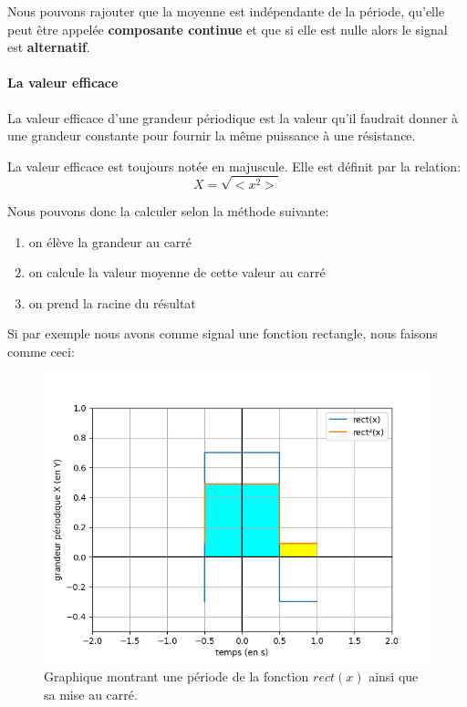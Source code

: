 \documentclass[12pt,a4paper,openany]{book}
\begin{document}
Nous pouvons rajouter que la moyenne est indépendante de la période, qu'elle peut être appelée \textbf{composante continue} et que si elle est nulle alors le signal est \textbf{alternatif}.

\paragraph{La valeur efficace} 
\begin{Definition}
La valeur efficace d'une grandeur périodique est la valeur qu'il faudrait donner à une grandeur constante pour fournir la même puissance à une résistance.
\end{Definition} 

La valeur efficace est toujours notée en majuscule. Elle est définit par la relation:
\begin{equation}
X = \sqrt{< x^{2} >}
\label{relationGrandeurEfficace}
\end{equation}

Nous pouvons donc la calculer selon la méthode suivante:
\begin{enumerate}
\item on élève la grandeur au carré
\item on calcule la valeur moyenne de cette valeur au carré
\item on prend la racine du résultat
\end{enumerate}

Si par exemple nous avons comme signal une fonction rectangle, nous faisons comme ceci:
\begin{figure}[!h]
\begin{center}
\includegraphics[scale=0.8]{Images/grapheAuCarre.png} 
\caption{Graphique montrant une période de la fonction $ rect(x) $ ainsi que sa mise au carré.}
\label{grapheFonctionMiseAuCarre}
\end{center}
\end{figure}
\end{document}
